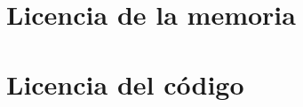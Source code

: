 \documentclass[a4paper]{book}
\begin{document}
\newpage{\pagestyle{empty}\cleardoublepage}


\newpage{\pagestyle{empty}\cleardoublepage}


\setcounter{tocdepth}{3}
\setcounter{secnumdepth}{3}

\tableofcontents %
\newpage
\listoffigures %
\listoftables

\mainmatter








\appendix


\chapter{Licencia de la memoria}
\label{app:docLicense}


\chapter{Licencia del código}

\end{document}
